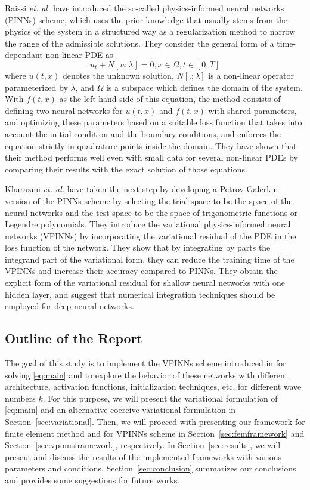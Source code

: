 Raissi \textit{et. al.} \cite{RAISSI2019686} have introduced the so-called physics-informed neural networks (PINNs) scheme, which uses the prior knowledge that usually stems from the physics of the system in a structured way as a regularization method to narrow the range of the admissible solutions. They consider the general form of a time-dependant non-linear PDE as
\begin{equation}
    u_t + N[u; \lambda] = 0, x \in \Omega, t \in [0, T]
\end{equation}
where $u(t, x)$ denotes the unknown solution, $N[.; \lambda]$ is a non-linear operator parameterized by $\lambda$, and $\Omega$ is a subspace which defines the domain of the system. With $f(t, x)$ as the left-hand side of this equation, the method consists of defining two neural networks for $u(t, x)$ and $f(t, x)$ with shared parameters, and optimizing these parameters based on a suitable loss function that takes into account the initial condition and the boundary conditions, and enforces the equation strictly in quadrature points inside the domain. They have shown that their method performs well even with small data for several non-linear PDEs by comparing their results with the exact solution of those equations.

Kharazmi \textit{et. al.} \cite{kharazmi2019variational} have taken the next step by developing a Petrov-Galerkin version of the PINNs scheme by selecting the trial space to be the space of the neural networks and the test space to be the space of trigonometric functions or Legendre polynomials. They introduce the variational physics-informed neural networks (VPINNs) by incorporating the variational residual of the PDE in the loss function of the network. They show that by integrating by parts the integrand part of the variational form, they can reduce the training time of the VPINNs and increase their accuracy compared to PINNs. They obtain the explicit form of the variational residual for shallow neural networks with one hidden layer, and suggest that numerical integration techniques should be employed for deep neural
networks.

\subsection*{Outline of the Report}

The goal of this study is to implement the VPINNs scheme introduced in \cite{kharazmi2019variational} for solving \eqref{eq:main} and to explore the behavior of these networks with different architecture, activation functions, initialization techniques, etc. for different wave numbers $k$. For this purpose, we will present the variational formulation of \eqref{eq:main} and an alternative coercive variational formulation in Section~\ref{sec:variational}. Then, we will proceed with presenting our framework for finite element method and for VPINNs scheme in Section~\ref{sec:femframework} and Section~\ref{sec:vpinnsframework}, respectively. In Section~\ref{sec:results}, we will present and discuss the results of the implemented frameworks with various parameters and conditions. Section~\ref{sec:conclusion} summarizes our conclusions and provides some suggestions for future works.

